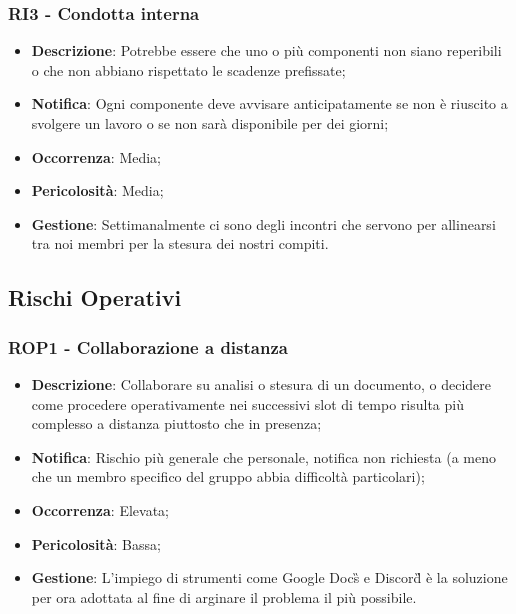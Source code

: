 	\subsubsection*{RI3 - Condotta interna}
	\begin{itemize}
		\item \textbf{Descrizione}: Potrebbe essere che uno o più componenti non siano reperibili o che non abbiano rispettato le scadenze prefissate;
		\item \textbf{Notifica}: Ogni componente deve avvisare anticipatamente se non è riuscito a svolgere un lavoro o se non sarà disponibile per dei giorni;
		\item \textbf{Occorrenza}: Media;
		\item \textbf{Pericolosità}: Media;
		\item \textbf{Gestione}: Settimanalmente ci sono degli incontri che servono per allinearsi tra noi membri per la stesura dei nostri compiti.
	\end{itemize}

   \subsection{Rischi Operativi}
  
  	\subsubsection*{ROP1 - Collaborazione a distanza}
  	\begin{itemize}
  		\item \textbf{Descrizione}: Collaborare su analisi o stesura di un documento, o decidere come procedere operativamente nei successivi slot di tempo risulta più complesso a distanza piuttosto che in presenza;
  		\item \textbf{Notifica}: Rischio più generale che personale, notifica non richiesta (a meno che un membro specifico del gruppo abbia difficoltà particolari);
  		\item \textbf{Occorrenza}: Elevata;
  		\item \textbf{Pericolosità}: Bassa;
  		\item \textbf{Gestione}: L'impiego di strumenti come Google Docs\G{} e Discord\G{} è la soluzione per ora adottata al fine di arginare il problema il più possibile.
  	\end{itemize}